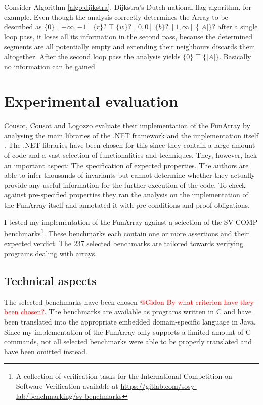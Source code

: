 \documentclass{report}
\newcommand{\bound}[1]{\{#1\}}
\newcommand{\fvalue}[1]{\;#1\;}
\begin{document}
 Consider Algorithm \ref{algo:dijkstra}, Dijkstra's Dutch national flag algorithm, for example. Even though the analysis correctly determines the Array to be described as $\bound{0} \fvalue{[-\infty, -1]} \bound{r}? \fvalue{\top} \bound{w}? \fvalue{[0, 0]} \bound{b}? \fvalue{[1, \infty]}  \bound{|A|}?$ after a single loop pass, it loses all its information in the second pass, because the determined segments are all potentially empty and extending their neighbours discards them altogether. After the second loop pass the analysis yields $\bound{0} \fvalue{\top} \bound{|A|}$. Basically no information can be gained   
 

\section{Experimental evaluation}

Cousot, Cousot and Logozzo evaluate their implementation of the FunArray by analysing the main libraries of the .NET framework and the implementation itself \cite{cousot2011}. The .NET libraries have been chosen for this since they contain a large amount of code and a vast selection of functionalities and techniques. They, however, lack an important aspect: The specification of expected properties. The authors are able to infer thousands of invariants but cannot determine whether they actually provide any useful information for the further execution of the code. To check against pre-specified properties they ran the analysis on the implementation of the FunArray itself and annotated it with pre-conditions and proof obligations. 


I tested my implementation of the FunArray against a selection of the SV\nobreakdash-COMP benchmarks\footnote{A collection of verification tasks for the International Competition on Software Verification available at \url{https://gitlab.com/sosy-lab/benchmarking/sv-benchmarks}}. These benchmarks each contain one or more assertions and their expected verdict. The 237 selected benchmarks are tailored towards verifying programs dealing with arrays.

\subsection{Technical aspects}

The selected benchmarks have been chosen \textcolor{red}{@Gidon By what criterion have they been chosen?}. The benchmarks are available as programs written in C and have been translated into the appropriate embedded domain-specific language in Java. Since my implementation of the FunArray only supports a limited amount of C commands, not all selected benchmarks were able to be properly translated and have been omitted instead.
\end{document}
